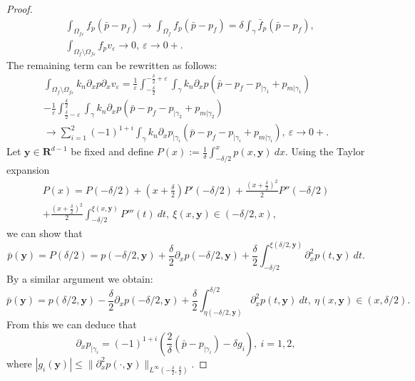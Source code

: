 \documentclass[a4paper]{article}
\def\vc#1{\mathbf{\boldsymbol{#1}}}     %
\def\ep{\varepsilon}
\def\Real{{\mathbf R}}
\def\norm#1{\|#1\|}
\def\yy{{\vc y}}
\newcommand{\note}[2]{{\color{blue} \textbf{ #1:} \textit{#2}}}
\begin{document}
\begin{proof}
\begin{align}
&\int_{\Omega_{f\ep}} f_p (\bar p-p_f) \to \int_{\Omega_{f}} f_p (\bar p-p_f) = \delta\int_{\gamma} \bar f_p (\bar p-p_f), \\
&\int_{\Omega_f\setminus\Omega_{f\ep}} f_p v_\ep \to 0,~\ep\to 0+.
\end{align}
The remaining term can be rewritten as follows:
\begin{multline}
\int_{\Omega_f\setminus\Omega_{f\ep}} k_n\partial_x p \partial_x v_\ep
= \frac1\ep\int_{-\frac\delta2}^{-\frac\delta2+\ep}\int_\gamma k_n\partial_x p (\bar p - p_f - p_{|\gamma_1} + p_{m|\gamma_1})\\
- \frac1\ep\int_{\frac\delta2-\ep}^{\frac\delta2}\int_\gamma k_n\partial_x p (\bar p - p_f - p_{|\gamma_2} + p_{m|\gamma_2})\\
\to \sum_{i=1}^2(-1)^{1+i}\int_\gamma k_n \partial_x p_{|\gamma_i} (\bar p - p_f - p_{|\gamma_i} + p_{m|\gamma_i}),~\ep\to 0+.
\end{multline}
Let $\vc y\in\Real^{d-1}$ be fixed and define $P(x):=\frac1\delta\int_{-\delta/2}^{x}p(x,\vc y)~dx$.
Using the Taylor expansion 
\begin{multline}
P(x) = P(-\delta/2) + (x+\frac\delta2)P'(-\delta/2) + \frac{(x+\frac\delta2)^2}{2}P''(-\delta/2)\\
+ \frac{(x+\frac\delta2)^2}2\int_{-\delta/2}^{\xi(x,\vc y)}P'''(t)~dt,~\xi(x,\vc y)\in(-\delta/2,x),
\end{multline}
we can show that
\[ \bar p(\vc y) = P(\delta/2) = p(-\delta/2,\vc y) + \frac\delta2\partial_x p(-\delta/2,\vc y) + \frac\delta2\int_{-\delta/2}^{\xi(\delta/2,\vc y)}\partial_x^2 p(t,\vc y)~dt. \]
By a similar argument we obtain:
\[ \bar p(\vc y) = p(\delta/2,\vc y) - \frac\delta2\partial_x p(-\delta/2,\vc y) + \frac\delta2\int_{\eta(-\delta/2,\vc y)}^{\delta/2}\partial_x^2 p(t,\vc y)~dt,~\eta(x,\vc y)\in(x,\delta/2). \]
From this we can deduce that
\begin{equation}
\label{eq:taylor_for_du}
\partial_x p_{|\gamma_i} = (-1)^{1+i}\left(\frac2\delta(\bar p - p_{|\gamma_i}) - \delta g_i\right),~i=1,2,
\end{equation}
where $|g_i(\vc y)|\le\norm{\partial_x^2 p(\cdot,\vc y)}_{L^\infty(-\frac\delta2,\frac\delta2)}$.

\end{proof}
\end{document}

